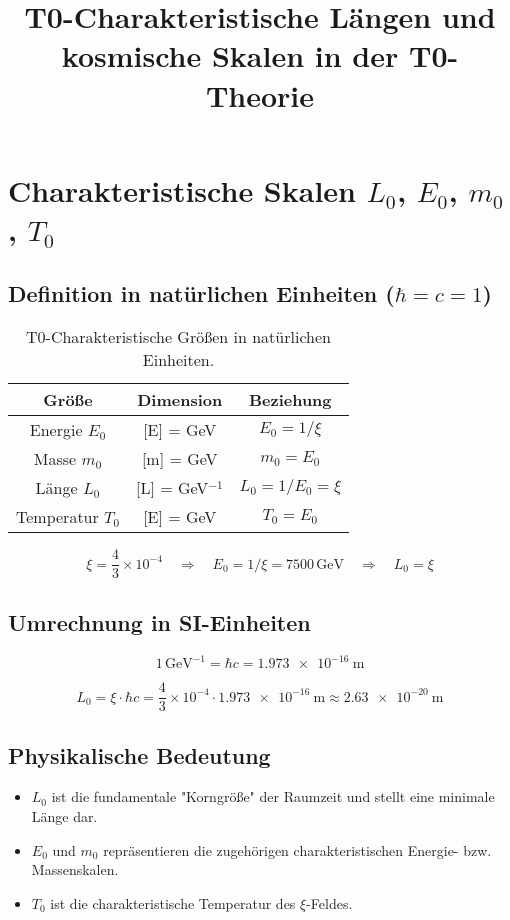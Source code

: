 \documentclass[12pt,a4paper]{article}
\title{T0-Charakteristische Längen und kosmische Skalen in der T0-Theorie}
\author{}
\date{}
\begin{document}
	
	\maketitle
	
	\section{Charakteristische Skalen $L_0$, $E_0$, $m_0$, $T_0$}
	
	\subsection{Definition in natürlichen Einheiten ($\hbar = c = 1$)}
	
	\begin{table}[h!]
		\centering
		\begin{tabular}{|c|c|c|}
			\hline
			\textbf{Größe} & \textbf{Dimension} & \textbf{Beziehung} \\
			\hline
			Energie $E_0$ & [E] = GeV & $E_0 = 1/\xi$ \\
			Masse $m_0$ & [m] = GeV & $m_0 = E_0$ \\
			Länge $L_0$ & [L] = GeV$^{-1}$ & $L_0 = 1/E_0 = \xi$ \\
			Temperatur $T_0$ & [E] = GeV & $T_0 = E_0$ \\
			\hline
		\end{tabular}
		\caption{T0-Charakteristische Größen in natürlichen Einheiten.}
	\end{table}
	
	\[
	\xi = \frac{4}{3} \times 10^{-4} \quad \Rightarrow \quad E_0 = 1/\xi = 7500 \,\text{GeV} \quad \Rightarrow \quad L_0 = \xi
	\]
	
	\subsection{Umrechnung in SI-Einheiten}
	
	\[
	1 \,\text{GeV}^{-1} = \hbar c = \SI{1.973e-16}{\meter}
	\]
	
	\[
	L_0 = \xi \cdot \hbar c = \frac{4}{3} \times 10^{-4} \cdot \SI{1.973e-16}{\meter} \approx \SI{2.63e-20}{\meter}
	\]
	
	\subsection{Physikalische Bedeutung}
	
	\begin{itemize}
		\item $L_0$ ist die fundamentale "Korngröße" der Raumzeit und stellt eine minimale Länge dar.
		\item $E_0$ und $m_0$ repräsentieren die zugehörigen charakteristischen Energie- bzw. Massenskalen.
		\item $T_0$ ist die charakteristische Temperatur des $\xi$-Feldes.
	\end{itemize}
	
\end{document}
